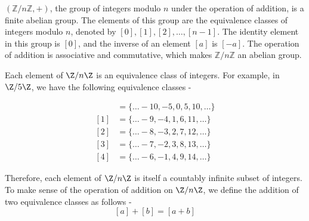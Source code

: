 \documentclass[openany]{book}
\begin{document}
\begin{example}
    $(\mathbb{Z}/n\mathbb{Z}, +)$, the group of integers modulo \( n \) under the operation of addition, is a finite abelian group. The elements of this group are the equivalence classes of integers modulo \( n \), denoted by \( [0], [1], [2], \ldots, [n-1] \). The identity element in this group is \( [0] \), and the inverse of an element \( [a] \) is \( [-a] \). The operation of addition is associative and commutative, which makes \( \mathbb{Z}/n\mathbb{Z} \) an abelian group. \\
\end{example}
\begin{mynote}
    Each element of $\Z/n\Z$ is an equivalence class of integers. For example, in $\Z/5\Z$, we have the following equivalence classes -
\begin{center}
\begin{align}
    [0] &= \{\ldots -10, -5, 0, 5, 10, \ldots\} \\
    [1] &= \{\ldots -9, -4, 1, 6, 11, \ldots\} \\
    [2] &= \{\ldots -8, -3, 2, 7, 12, \ldots\} \\
    [3] &= \{\ldots -7, -2, 3, 8, 13, \ldots\} \\
    [4] &= \{\ldots -6, -1, 4, 9, 14, \ldots\}
\end{align}
\end{center}
Therefore, each element of $\Z/n\Z$ is itself a countably infinite subset of integers. To make sense of the operation of addition on $\Z/n\Z$, we define the addition of two equivalence classes as follows -
\[[a] + [b] = [a + b]\]
\end{mynote}
\end{document}
